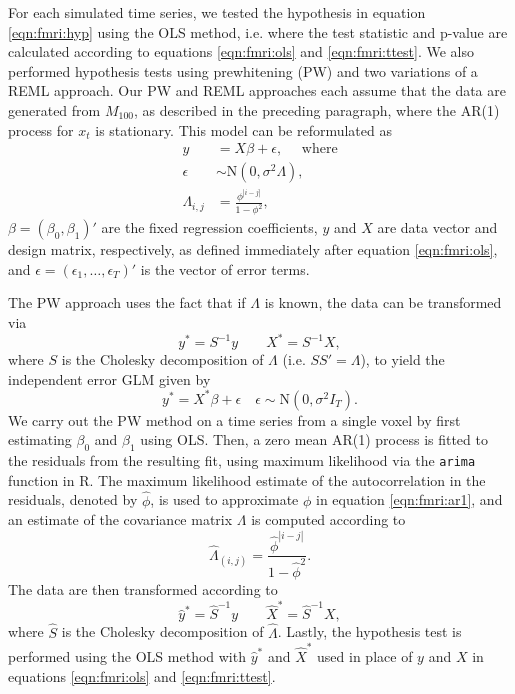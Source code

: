 For each simulated time series, we tested the hypothesis in equation \eqref{eqn:fmri:hyp} using the OLS method, i.e. where the test statistic and p-value are calculated according to equations \eqref{eqn:fmri:ols} and \eqref{eqn:fmri:ttest}. We also performed hypothesis tests using prewhitening (PW) and two variations of a REML approach. Our PW and REML approaches each assume that the data are generated from $M_{100}$, as described in the preceding paragraph, where the AR(1) process for $x_t$ is stationary. This model can be reformulated as
\begin{align}
y &= X\beta + \epsilon, \quad \mbox{ where} \label{eqn:fmri:ar1} \\
\epsilon &\sim \mbox{N}(0,\sigma^2\Lambda), \nonumber \\
\Lambda_{i,j} &= \frac{\phi^{|i-j|}}{1 - \phi^2}, \nonumber
\end{align}
$\beta = (\beta_0,\beta_1)'$ are the fixed regression coefficients, $y$ and $X$ are data vector and design matrix, respectively, as defined immediately after equation \eqref{eqn:fmri:ols}, and $\epsilon = (\epsilon_1,\ldots,\epsilon_T)'$ is the vector of error terms.

The PW approach uses the fact that if $\Lambda$ is known, the data can be transformed via
\begin{equation}
y^* = S^{-1}y \qquad X^* = S^{-1}X, \label{eqn:gls:trans}
\end{equation}
where $S$ is the Cholesky decomposition of $\Lambda$ (i.e. $SS' = \Lambda$), to yield the independent error GLM given by
\begin{equation}
y^* = X^*\beta + \epsilon \quad \epsilon \sim \mbox{N}(0,\sigma^2I_T). \label{eqn:gls}
\end{equation}
We carry out the PW method on a time series from a single voxel by first estimating $\beta_0$ and $\beta_1$ using OLS. Then, a zero mean
AR(1) process is fitted to the residuals from the resulting fit, using maximum likelihood via the {\tt arima} function in R. The maximum likelihood estimate of the autocorrelation in the residuals, denoted by $\hat{\phi}$, is used to approximate $\phi$ in equation \eqref{eqn:fmri:ar1}, and an estimate of the covariance matrix $\Lambda$ is computed according to
\begin{equation}
\hat{\Lambda}_{(i,j)} = \frac{\hat{\phi}^{|i-j|}}{1-\hat{\phi}^2}. \label{eqn:pw:cor}
\end{equation}
The data are then transformed according to
\begin{equation}
\hat{y}^* = \hat{S}^{-1}y \qquad \hat{X}^* = \hat{S}^{-1}X, \label{eqn:pw:trans}
\end{equation}
where $\hat{S}$ is the Cholesky decomposition of $\hat{\Lambda}$. Lastly, the hypothesis test is performed using the OLS method with $\hat{y}^*$ and $\hat{X}^*$ used in place of $y$ and $X$ in equations \eqref{eqn:fmri:ols} and \eqref{eqn:fmri:ttest}.

